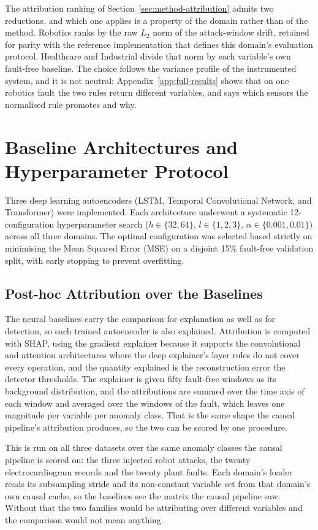 The attribution ranking of Section~\ref{sec:method-attribution} admits two reductions, and which one applies is a property of the domain rather than of the method. Robotics ranks by the raw $L_2$ norm of the attack-window drift, retained for parity with the reference implementation that defines this domain's evaluation protocol. Healthcare and Industrial divide that norm by each variable's own fault-free baseline. The choice follows the variance profile of the instrumented system, and it is not neutral: Appendix~\ref{app:full-results} shows that on one robotics fault the two rules return different variables, and says which sensors the normalised rule promotes and why.

\section{Baseline Architectures and Hyperparameter Protocol}
Three deep learning autoencoders (LSTM, Temporal Convolutional Network, and Transformer) were implemented. Each architecture underwent a systematic 12-configuration hyperparameter search ($h \in \{32, 64\}$, $l \in \{1, 2, 3\}$, $\alpha \in \{0.001, 0.01\}$) across all three domains. The optimal configuration was selected based strictly on minimising the Mean Squared Error (MSE) on a disjoint 15\% fault-free validation split, with early stopping to prevent overfitting.

\subsection{Post-hoc Attribution over the Baselines}
\label{sec:setup-shap}

The neural baselines carry the comparison for explanation as well as for
detection, so each trained autoencoder is also explained. Attribution is
computed with SHAP, using the gradient explainer because it supports the
convolutional and attention architectures where the deep explainer's layer
rules do not cover every operation, and the quantity explained is the
reconstruction error the detector thresholds. The explainer is given fifty
fault-free windows as its background distribution, and the attributions are
summed over the time axis of each window and averaged over the windows of the
fault, which leaves one magnitude per variable per anomaly class. That is the
same shape the causal pipeline's attribution produces, so the two can be scored
by one procedure.

This is run on all three datasets over the same anomaly classes the causal
pipeline is scored on: the three injected robot attacks, the twenty
electrocardiogram records and the twenty plant faults. Each domain's loader
reads its subsampling stride and its non-constant variable set from that
domain's own causal cache, so the baselines see the matrix the causal pipeline
saw. Without that the two families would be attributing over different
variables and the comparison would not mean anything.

